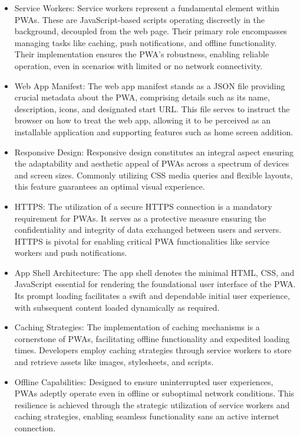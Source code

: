 \documentclass[12pt,a4paper, twosite]{article}
\begin{document}
\begin{itemize}
  \item Service Workers:
  Service workers represent a fundamental element within PWAs. These are JavaScript-based scripts operating discreetly in the background, decoupled from the web page. Their primary role encompasses managing tasks like caching, push notifications, and offline functionality. Their implementation ensures the PWA's robustness, enabling reliable operation, even in scenarios with limited or no network connectivity.

  \item Web App Manifest:
  The web app manifest stands as a JSON file providing crucial metadata about the PWA, comprising details such as its name, description, icons, and designated start URL. This file serves to instruct the browser on how to treat the web app, allowing it to be perceived as an installable application and supporting features such as home screen addition.

  \item Responsive Design:
  Responsive design constitutes an integral aspect ensuring the adaptability and aesthetic appeal of PWAs across a spectrum of devices and screen sizes. Commonly utilizing CSS media queries and flexible layouts, this feature guarantees an optimal visual experience.

  \item HTTPS:
  The utilization of a secure HTTPS connection is a mandatory requirement for PWAs. It serves as a protective measure ensuring the confidentiality and integrity of data exchanged between users and servers. HTTPS is pivotal for enabling critical PWA functionalities like service workers and push notifications.

  \item App Shell Architecture:
  The app shell denotes the minimal HTML, CSS, and JavaScript essential for rendering the foundational user interface of the PWA. Its prompt loading facilitates a swift and dependable initial user experience, with subsequent content loaded dynamically as required.

  \item Caching Strategies:
  The implementation of caching mechanisms is a cornerstone of PWAs, facilitating offline functionality and expedited loading times. Developers employ caching strategies through service workers to store and retrieve assets like images, stylesheets, and scripts.

  \item Offline Capabilities:
  Designed to ensure uninterrupted user experiences, PWAs adeptly operate even in offline or suboptimal network conditions. This resilience is achieved through the strategic utilization of service workers and caching strategies, enabling seamless functionality sans an active internet connection.


\end{itemize}
\end{document}
